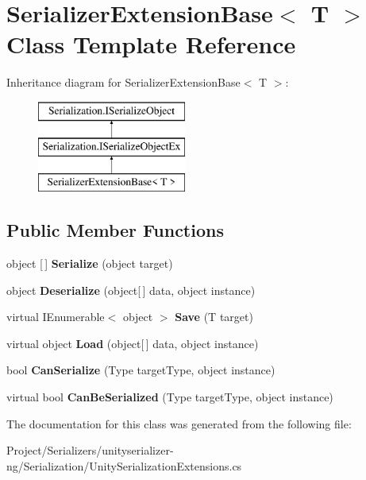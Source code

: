 \hypertarget{class_serializer_extension_base}{}\section{Serializer\+Extension\+Base$<$ T $>$ Class Template Reference}
\label{class_serializer_extension_base}
Inheritance diagram for Serializer\+Extension\+Base$<$ T $>$\+:\begin{figure}[H]
\begin{center}
\leavevmode
\includegraphics[height=3.000000cm]{class_serializer_extension_base}
\end{center}
\end{figure}
\subsection*{Public Member Functions}
\begin{DoxyCompactItemize}
\item 
\mbox{\label{class_serializer_extension_base_affe527ff9e902bb2eeaa37ec1a9d2f19}} 
object \mbox{[}$\,$\mbox{]} {\bfseries Serialize} (object target)
\item 
\mbox{\label{class_serializer_extension_base_a04524500adb2abafdb0e606148145e07}} 
object {\bfseries Deserialize} (object\mbox{[}$\,$\mbox{]} data, object instance)
\item 
\mbox{\label{class_serializer_extension_base_a258793f178a3f8ef78dfd7ca139d4411}} 
virtual I\+Enumerable$<$ object $>$ {\bfseries Save} (T target)
\item 
\mbox{\label{class_serializer_extension_base_a3792a9b27056e30ca0ac91531936ae47}} 
virtual object {\bfseries Load} (object\mbox{[}$\,$\mbox{]} data, object instance)
\item 
\mbox{\label{class_serializer_extension_base_af730b106e15a036d8099ebf63d6df543}} 
bool {\bfseries Can\+Serialize} (Type target\+Type, object instance)
\item 
\mbox{\label{class_serializer_extension_base_a50e69037fda6bdcc080cdc3c51d25b99}} 
virtual bool {\bfseries Can\+Be\+Serialized} (Type target\+Type, object instance)
\end{DoxyCompactItemize}


The documentation for this class was generated from the following file\+:\begin{DoxyCompactItemize}
\item 
Project/\+Serializers/unityserializer-\/ng/\+Serialization/Unity\+Serialization\+Extensions.\+cs\end{DoxyCompactItemize}
